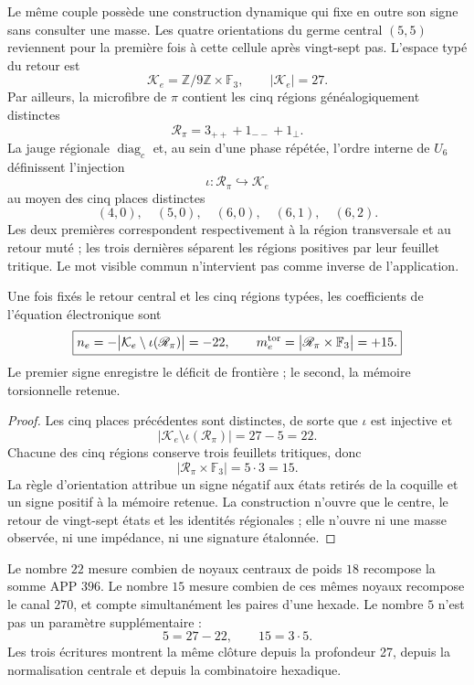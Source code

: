 Le même couple possède une construction dynamique qui fixe en outre son signe sans
consulter une masse. Les quatre orientations du germe central
\((5,5)\) reviennent pour la première fois à cette cellule après vingt-sept pas.
L'espace typé du retour est
\[
 \mathcal K_e=\mathbb Z/9\mathbb Z\times\mathbb F_3,
 \qquad |\mathcal K_e|=27.
\]
Par ailleurs, la microfibre de \(\pi\) contient les cinq régions
généalogiquement distinctes
\[
 \mathscr R_\pi=3_{++}+1_{--}+1_{\perp}.
\]
La jauge régionale \(\operatorname{diag}_c\) et, au sein d'une phase répétée,
l'ordre interne de \(U_6\) définissent l'injection
\[
 \iota:\mathscr R_\pi\hookrightarrow\mathcal K_e
\]
au moyen des cinq places distinctes
\[
 (4,0),\quad(5,0),\quad(6,0),\quad(6,1),\quad(6,2).
\]
Les deux premières correspondent respectivement à la région transversale et
au retour muté ; les trois dernières séparent les régions positives par leur
feuillet tritique. Le mot visible commun n'intervient pas comme inverse de l'application.

\begin{theorem}
\label{p12-83-c15-s2:thm:selector-persistencia-electron-rev7}
Une fois fixés le retour central et les cinq régions typées, les coefficients de
l'équation électronique sont
\[
 \boxed{
 n_e=-\bigl|\mathcal K_e\setminus\iota(\mathscr R_\pi)\bigr|=-22,
 \qquad
 m_e^{\rm tor}=\bigl|\mathscr R_\pi\times\mathbb F_3\bigr|=+15.}
\]
Le premier signe enregistre le déficit de frontière ; le second, la mémoire
torsionnelle retenue.
\end{theorem}

\begin{proof}
Les cinq places précédentes sont distinctes, de sorte que \(\iota\) est
injective et
\[
 |\mathcal K_e\setminus\iota(\mathscr R_\pi)|=27-5=22.
\]
Chacune des cinq régions conserve trois feuillets tritiques, donc
\[
 |\mathscr R_\pi\times\mathbb F_3|=5\cdot3=15.
\]
La règle d'orientation attribue un signe négatif aux états retirés de la
coquille et un signe positif à la mémoire retenue. La construction n'ouvre que le
centre, le retour de vingt-sept états et les identités régionales ; elle
n'ouvre ni une masse observée, ni une impédance, ni une signature étalonnée.
\end{proof}

Le nombre \(22\) mesure combien de noyaux centraux de poids \(18\) recompose la
somme APP \(396\). Le nombre \(15\) mesure combien de ces mêmes noyaux
recompose le canal \(270\), et compte simultanément les paires d'une
hexade. Le nombre \(5\) n'est pas un paramètre supplémentaire :
\[
 5=27-22,\qquad 15=3\cdot5.
\]
Les trois écritures montrent la même clôture depuis la profondeur 27,
depuis la normalisation centrale et depuis la combinatoire hexadique.

